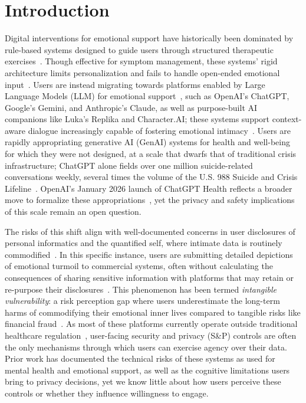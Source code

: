 \documentclass[letterpaper,twocolumn,10pt]{article}
\begin{document}
\section{Introduction}
\label{sec:introduction}
Digital interventions for emotional support have historically been dominated by rule-based systems designed to guide users through structured therapeutic exercises~\cite{abd2019overview}. Though effective for symptom management, these systems' rigid architecture limits personalization and fails to handle open-ended emotional input~\cite{hua2025charting, yeh2025does}. Users are instead migrating towards platforms enabled by Large Language Models (LLM) for emotional support~\cite{kwesi2025exploring}, such as OpenAI's ChatGPT, Google's Gemini, and Anthropic's Claude, as well as purpose-built AI companions like Luka's Replika and Character.AI; these systems support context-aware dialogue increasingly capable of fostering emotional intimacy~\cite{de2023benefits, ma2023understanding, song2024typing}. Users are rapidly appropriating generative AI (GenAI) systems for health and well-being for which they were not designed, at a scale that dwarfs that of traditional crisis infrastructure; ChatGPT alone fields over one million suicide-related conversations weekly, several times the volume of the U.S. 988 Suicide and Crisis Lifeline~\cite{techcrunch2025suicide, kff2025988}. OpenAI’s January 2026 launch of ChatGPT Health reflects a broader move to formalize these appropriations~\cite{openai2026health}, yet the privacy and safety implications of this scale remain an open question.

The risks of this shift align with well-documented concerns in user disclosures of personal informatics and the quantified self, where intimate data is routinely commodified~\cite{lupton2016diverse}. In this specific instance, users are submitting detailed depictions of emotional turmoil to commercial systems, often without calculating the consequences of sharing sensitive information with platforms that may retain or re-purpose their disclosures~\cite{king2025user}. This phenomenon has been termed \textit{intangible vulnerability}: a risk perception gap where users underestimate the long-term harms of commodifying their emotional inner lives compared to tangible risks like financial fraud~\cite{kwesi2025exploring}. As most of these platforms currently operate outside traditional healthcare regulation~\cite{kwesi2025exploring, rezaeikhonakdar2023ai}, user-facing security and privacy (S\&P) controls are often the only mechanisms through which users can exercise agency over their data. Prior work has documented the technical risks of these systems as used for mental health and emotional support, as well as the cognitive limitations users bring to privacy decisions, yet we know little about how users perceive these controls or whether they influence willingness to engage.
\end{document}
